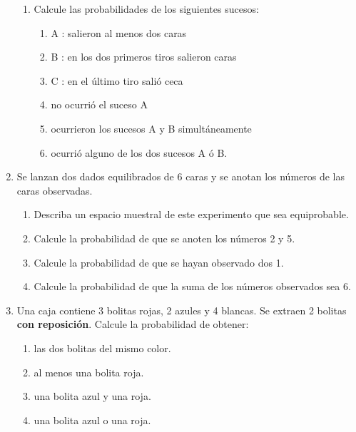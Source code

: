 \documentclass[a4paper, 11pt]{article}
\begin{document}
\begin{enumerate}
\begin{enumerate}
\item Calcule las probabilidades de los siguientes sucesos:\vspace{-0.1cm}


\begin{enumerate}
\item A : salieron al menos dos caras


\item B : en los dos primeros tiros salieron caras


\item C : en el \'{u}ltimo tiro sali\'{o} ceca


\item no ocurri\'{o} el suceso A


\item ocurrieron los sucesos A y B simult\'{a}neamente


\item ocurri\'{o} alguno de los dos sucesos A \'{o} B.
\end{enumerate}
\end{enumerate}




\item Se lanzan dos dados equilibrados de 6 caras y se anotan los n\'umeros de las caras observadas.
\begin{enumerate}
\item Describa un espacio muestral de este experimento que sea equiprobable.
\item Calcule la probabilidad de que se anoten los n\'umeros 2 y 5.
\item Calcule la probabilidad de que se hayan observado dos 1.
\item Calcule la probabilidad de que la suma de los n\'umeros observados sea 6.
\end{enumerate}




\item \label{bolitas} Una caja contiene 3 bolitas rojas, 2 azules y 4 blancas. Se extraen 2
bolitas \textbf{con reposici\'{o}n}. Calcule la probabilidad de
obtener:\vspace{-0.1cm}


\begin{enumerate}
\item las dos bolitas del mismo color.
\item al menos una bolita roja.
\item una bolita azul y una roja.
\item una bolita azul o una roja.
\end{enumerate}



\end{enumerate}
\end{document}
